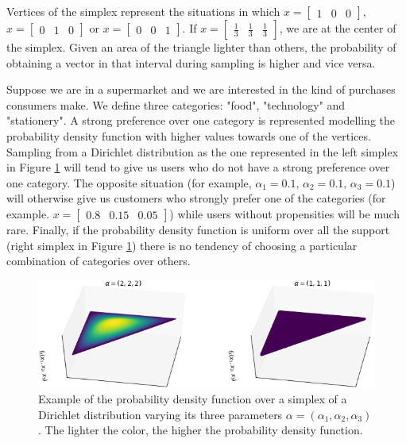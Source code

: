 Vertices of the simplex represent the situations in which $x = \begin{bmatrix}1 & 0 & 0 \end{bmatrix}$, $x = \begin{bmatrix}0 & 1 & 0 \end{bmatrix}$ or $x = \begin{bmatrix}0 & 0 & 1 \end{bmatrix}$.
If $x = \begin{bmatrix}\frac{1}{3} & \frac{1}{3} & \frac{1}{3} \end{bmatrix}$, we are at the center of the simplex.
Given an area of the triangle lighter than others, the probability of obtaining a vector in that interval during sampling is higher and vice versa.

Suppose we are in a supermarket and we are interested in the kind of purchases consumers make.
We define three categories: "food", "technology" and "stationery".
A strong preference over one category is represented modelling the probability density function with higher values towards one of the vertices.
Sampling from a Dirichlet distribution as the one represented in the left simplex in Figure \ref{fig:dirparams} will tend to give us users who do not have a strong preference over one category.
The opposite situation (for example, $\alpha_1=0.1, \, \alpha_2=0.1, \, \alpha_3=0.1$) will otherwise give us customers who strongly prefer one of the categories (for example. $x = \begin{bmatrix}0.8 & 0.15 & 0.05 \end{bmatrix}$) while users without propensities will be much rare.
Finally, if the probability density function is uniform over all the support (right simplex in Figure \ref{fig:dirparams}) there is no tendency of choosing a particular combination of categories over others.

\begin{figure}[H]
    \centering
    \includegraphics[width=\textwidth]{images/dirichlet}
    \caption{Example of the probability density function over a simplex of a Dirichlet distribution varying its three parameters $\alpha = (\alpha_1, \alpha_2, \alpha_3)$. The lighter the color, the higher the probability density function.}
    \label{fig:dirparams}
\end{figure}

